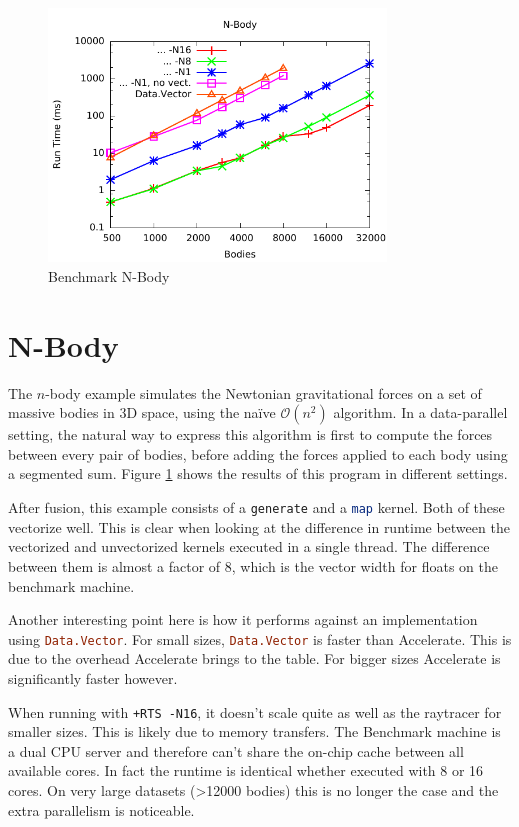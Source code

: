 \documentclass[a4paper,bibliography=totocnumbered,parskip,headsepline]{scrbook}
\begin{document}
\begin{figure}[th]
    \centering
    \includegraphics[width=0.8\textwidth]{images/benchmarks/nbody/nbody}
    \caption{Benchmark N-Body}
    \label{fig:nbody}
\end{figure}
\section{N-Body}
The $n$-body example simulates the Newtonian gravitational forces on a set of massive bodies in 3D space, using the na\"ive $\mathcal{O}\left( n^{2} \right)$ algorithm.
In a data-parallel setting, the natural way to express this algorithm is first to compute the forces between every pair of bodies, before adding the forces applied to each body using a segmented sum.
Figure \ref{fig:nbody} shows the results of this program in different settings.

After fusion, this example consists of a \lstinline[language=haskell]!generate! and a \lstinline[language=haskell]!map! kernel.
Both of these vectorize well.
This is clear when looking at the difference in runtime between the vectorized and unvectorized kernels executed in a single thread.
The difference between them is almost a factor of 8, which is the vector width for floats on the benchmark machine.

Another interesting point here is how it performs against an implementation using \lstinline[language=haskell]!Data.Vector!.
For small sizes, \lstinline[language=haskell]!Data.Vector! is faster than Accelerate.
This is due to the overhead Accelerate brings to the table.
For bigger sizes Accelerate is significantly faster however.

When running with \texttt{+RTS -N16}, it doesn't scale quite as well as the raytracer for smaller sizes.
This is likely due to memory transfers.
The Benchmark machine is a dual CPU server and therefore can't share the on-chip cache between all available cores.
In fact the runtime is identical whether executed with 8 or 16 cores.
On very large datasets (>12000 bodies) this is no longer the case and the extra parallelism is noticeable.
\end{document}
